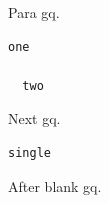 \documentclass{article}
\begin{document}
Para gq.
\begin{verbatim}
one

  two
\end{verbatim}
Next gq.

\begin{verbatim}
single
\end{verbatim}

After blank gq.
\end{document}
